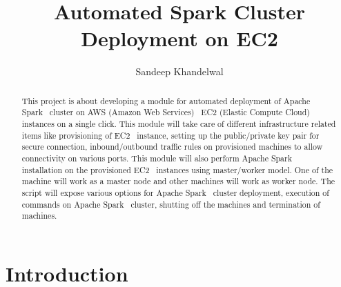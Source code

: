 
\title{Automated Spark Cluster Deployment on EC2}


\author{Sandeep Khandelwal}


\renewcommand{\shortauthors}{Sandeep}


\begin{abstract}

This project is about developing a module for automated deployment of
Apache Spark~\cite{hid-sp18-511-www-spark} cluster on AWS (Amazon Web
Services)~\cite{hid-sp18-511-www-aws} EC2 (Elastic Compute
Cloud)~\cite{hid-sp18-511-www-ec2} instances on a single click. This
module will take care of different infrastructure related items like
provisioning of EC2~\cite{hid-sp18-511-www-ec2} instance, setting up
the public/private key pair for secure connection, inbound/outbound
traffic rules on provisioned machines to allow connectivity on various
ports. This module will also perform Apache
Spark~\cite{hid-sp18-511-www-spark} installation on the provisioned
EC2~\cite{hid-sp18-511-www-ec2} instances using master/worker
model. One of the machine will work as a master node and other
machines will work as worker node. The script will expose various
options for Apache Spark~\cite{hid-sp18-511-www-spark} cluster
deployment, execution of commands on Apache
Spark~\cite{hid-sp18-511-www-spark} cluster, shutting off the machines
and termination of machines.

\end{abstract}



\maketitle

\section{Introduction}

